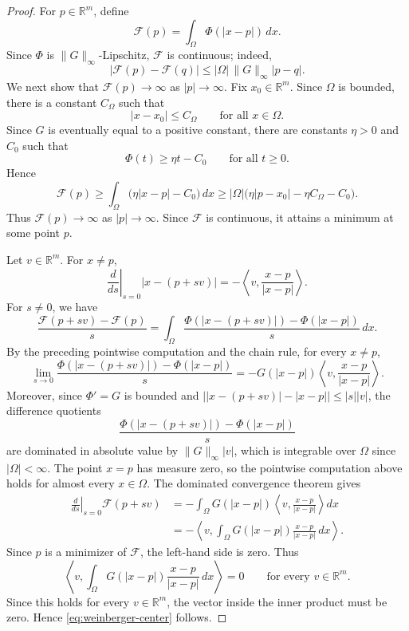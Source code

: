 \documentclass[11pt,letterpaper,reqno]{amsart}
\theoremstyle{definition}
\newcommand{\R}{\mathbb R}
\begin{document}
\begin{proof}
For \(p\in\R^m\), define
\[
        \mathcal F(p)=\int_\Omega \Phi(|x-p|)\,dx.
\]
Since \(\Phi\) is \(\|G\|_\infty\)-Lipschitz, \(\mathcal F\) is continuous;
indeed,
\[
        |\mathcal F(p)-\mathcal F(q)|
        \le |\Omega|\,\|G\|_\infty |p-q|.
\]
We next show that \(\mathcal F(p)\to\infty\) as \(|p|\to\infty\). Fix
\(x_0\in\R^m\). Since \(\Omega\) is bounded, there is a constant
\(C_\Omega\) such that
\[
        |x-x_0|\le C_\Omega
        \qquad\text{for all }x\in\Omega.
\]
Since \(G\) is eventually equal to a positive constant, there are
constants \(\eta>0\) and \(C_0\) such that
\[
        \Phi(t)\ge \eta t-C_0
        \qquad\text{for all }t\ge0.
\]
Hence
\[
        \mathcal F(p)
        \ge
        \int_\Omega \bigl(\eta |x-p|-C_0\bigr)\,dx  
        \ge
        |\Omega|\bigl(\eta |p-x_0|-\eta C_\Omega-C_0\bigr).
\]
Thus \(\mathcal F(p)\to\infty\) as \(|p|\to\infty\). Since
\(\mathcal F\) is continuous, it attains a minimum at some point \(p\).

Let \(v\in\R^m\). For \(x\ne p\),
\[
        \left.\frac{d}{ds}\right|_{s=0}|x-(p+sv)|
        =
        -\left\langle v,\frac{x-p}{|x-p|}\right\rangle .
\]
For \(s\neq0\), we have
\[
\frac{\mathcal F(p+sv)-\mathcal F(p)}{s}
=
\int_\Omega
\frac{\Phi(|x-(p+sv)|)-\Phi(|x-p|)}{s}\,dx .
\]
By the preceding pointwise computation and the chain rule, for every
\(x\neq p\),
\[
\lim_{s\to0}
\frac{\Phi(|x-(p+sv)|)-\Phi(|x-p|)}{s}
=
-G(|x-p|)
\left\langle v,\frac{x-p}{|x-p|}\right\rangle .
\]
Moreover, since \(\Phi'=G\) is bounded and $\left||x-(p+sv)|-|x-p|\right|\le |s||v|$, the difference quotients
\[
        \frac{\Phi(|x-(p+sv)|)-\Phi(|x-p|)}{s}
\]
are dominated in absolute value by \(\|G\|_\infty |v|\), which is
integrable over \(\Omega\) since \(|\Omega|<\infty\). The point \(x=p\) has measure zero, so the pointwise computation above holds for almost every \(x\in\Omega\). The dominated convergence theorem gives
\[
\begin{aligned}
        \left.\frac{d}{ds}\right|_{s=0}\mathcal F(p+sv)
        &=
        -\int_\Omega
        G(|x-p|)
        \left\langle v,\frac{x-p}{|x-p|}\right\rangle dx  \\
        &=
        -\left\langle v,
        \int_\Omega G(|x-p|)\frac{x-p}{|x-p|}\,dx
        \right\rangle .
\end{aligned}
\]
Since \(p\) is a minimizer of \(\mathcal F\), the left-hand side is zero. Thus
\[
        \left\langle v,
        \int_\Omega G(|x-p|)\frac{x-p}{|x-p|}\,dx
        \right\rangle=0
        \qquad\text{for every }v\in\R^m.
\]
Since this holds for every \(v\in\R^m\), the vector inside the inner product must be zero. Hence \eqref{eq:weinberger-center} follows.
\end{proof}
\end{document}

